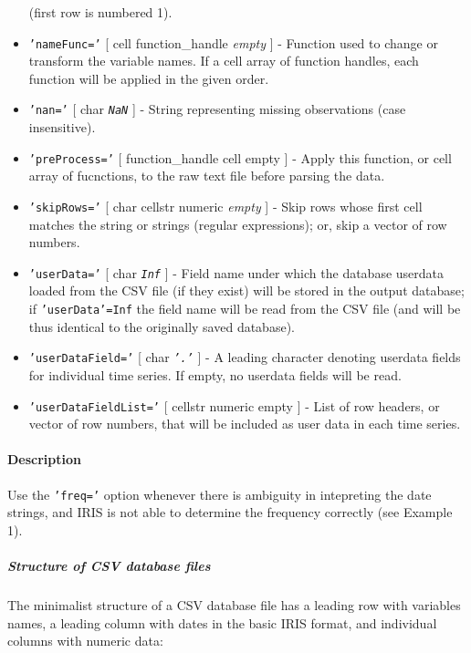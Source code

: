 \begin{itemize}
   (first row is numbered 1).
 \item
   \texttt{'nameFunc='} {[} cell \textbar{} function\_handle \textbar{}
   \emph{empty} {]} - Function used to change or transform the variable
   names. If a cell array of function handles, each function will be
   applied in the given order.
 \item
   \texttt{'nan='} {[} char \textbar{} \emph{\texttt{NaN}} {]} - String
   representing missing observations (case insensitive).
 \item
   \texttt{'preProcess='} {[} function\_handle \textbar{} cell \textbar{}
   empty {]} - Apply this function, or cell array of fucnctions, to the
   raw text file before parsing the data.
 \item
   \texttt{'skipRows='} {[} char \textbar{} cellstr \textbar{} numeric
   \textbar{} \emph{empty} {]} - Skip rows whose first cell matches the
   string or strings (regular expressions); or, skip a vector of row
   numbers.
 \item
   \texttt{'userData='} {[} char \textbar{} \emph{\texttt{Inf}} {]} -
   Field name under which the database userdata loaded from the CSV file
   (if they exist) will be stored in the output database; if
   \texttt{'userData'=Inf} the field name will be read from the CSV file
   (and will be thus identical to the originally saved database).
 \item
   \texttt{'userDataField='} {[} char \textbar{} \emph{\texttt{'.'}} {]}
   - A leading character denoting userdata fields for individual time
   series. If empty, no userdata fields will be read.
 \item
   \texttt{'userDataFieldList='} {[} cellstr \textbar{} numeric
   \textbar{} empty {]} - List of row headers, or vector of row numbers,
   that will be included as user data in each time series.
 \end{itemize}
 
 \paragraph{Description}
 
 Use the \texttt{'freq='} option whenever there is ambiguity in
 intepreting the date strings, and IRIS is not able to determine the
 frequency correctly (see Example 1).
 
 \subparagraph{Structure of CSV database files}
 
 The minimalist structure of a CSV database file has a leading row with
 variables names, a leading column with dates in the basic IRIS format,
 and individual columns with numeric data:
 
